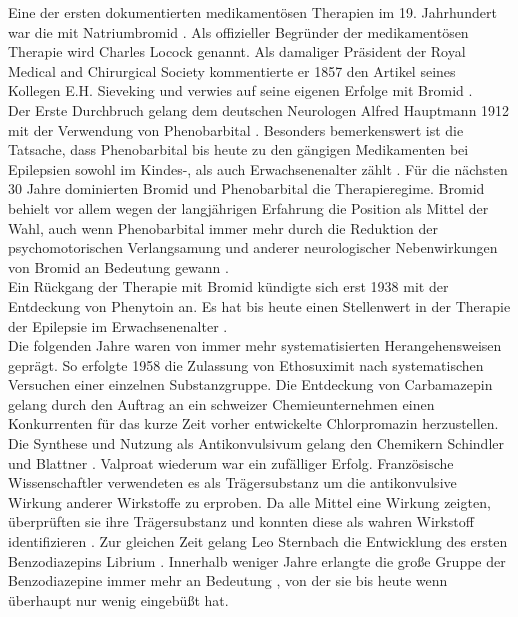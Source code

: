 \documentclass[a4paper,11pt]{report}
\begin{document}
Eine der ersten dokumentierten medikamentösen Therapien im 19. Jahrhundert war die mit Natriumbromid {\cite{OConnor.1857}\cite{ToddRobertBentley18091860.}. Als offizieller Begründer der medikamentösen Therapie wird Charles Locock genannt\cite{Brodie.2010}. Als damaliger Präsident der Royal Medical and Chirurgical Society kommentierte er 1857 den Artikel seines Kollegen E.H. Sieveking \cite{Sieveking.1857} und verwies auf seine eigenen Erfolge mit Bromid \cite{Eadie.2012}.\\
Der Erste Durchbruch gelang dem deutschen Neurologen Alfred Hauptmann 1912 mit der Verwendung von Phenobarbital \cite{Hauptmann.1912}. Besonders bemerkenswert ist die Tatsache, dass Phenobarbital bis heute zu den gängigen Medikamenten bei Epilepsien sowohl im Kindes-, als auch Erwachsenenalter zählt \cite{DGN.2017}. Für die nächsten 30 Jahre dominierten Bromid und Phenobarbital die Therapieregime. Bromid behielt vor allem wegen der langjährigen Erfahrung die Position als Mittel der Wahl, auch wenn Phenobarbital immer mehr durch die Reduktion der psychomotorischen Verlangsamung und anderer neurologischer Nebenwirkungen von Bromid an Bedeutung gewann \cite{Yasiry.2012}.\\
Ein Rückgang der Therapie mit Bromid kündigte sich erst 1938 mit der Entdeckung von Phenytoin \cite{Merritt.1938} an. Es hat bis heute einen Stellenwert in der Therapie der Epilepsie im Erwachsenenalter \cite{DGN.2017}.\\
Die folgenden Jahre waren von immer mehr systematisierten Herangehensweisen geprägt.  So erfolgte 1958 die Zulassung von Ethosuximit \cite{Kenneth.1961} nach systematischen Versuchen einer einzelnen Substanzgruppe. Die Entdeckung von Carbamazepin gelang durch den Auftrag an ein schweizer Chemieunternehmen einen Konkurrenten für das kurze Zeit vorher entwickelte Chlorpromazin herzustellen. Die Synthese und Nutzung als Antikonvulsivum gelang den Chemikern Schindler und Blattner \cite{Schindler.1961}. Valproat wiederum war ein zufälliger Erfolg. Französische Wissenschaftler verwendeten es als Trägersubstanz um die antikonvulsive Wirkung anderer Wirkstoffe zu erproben. Da alle Mittel eine Wirkung zeigten, überprüften sie ihre Trägersubstanz und konnten diese als wahren Wirkstoff identifizieren \cite{MEUNIER.1963}. Zur gleichen Zeit gelang Leo Sternbach die Entwicklung des ersten Benzodiazepins Librium \cite{Sternbach.1965}. Innerhalb weniger Jahre erlangte die große Gruppe der Benzodiazepine immer mehr an Bedeutung \cite{BROWNE.1973}, von der sie bis heute wenn überhaupt nur wenig eingebüßt hat. \\
}
\end{document}
